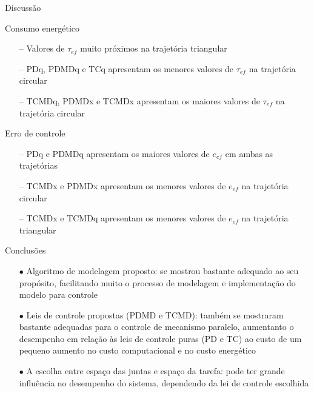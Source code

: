 \documentclass[25pt,landscape]{beamer}
\begin{document}
\begin{frame}{Discussão}
    \begin{block}{Consumo energético}
        \begin{itemize}
            \item[--] Valores de $\tau_{ef}$ muito próximos na trajetória triangular \\[4pt]
            \item[--] PDq, PDMDq e TCq apresentam os menores valores de $\tau_{ef}$ na trajetória circular \\[4pt]
            \item[--] TCMDq, PDMDx e TCMDx apresentam os maiores valores de $\tau_{ef}$ na trajetória circular \\[4pt]
        \end{itemize}
    \end{block}
    \begin{block}{Erro de controle}
        \begin{itemize}
            \item[--] PDq e PDMDq apresentam os maiores valores de $e_{ef}$ em ambas as trajetórias \\[4pt]
            \item[--] TCMDx e PDMDx apresentam os menores valores de $e_{ef}$ na trajetória circular \\[4pt]
            \item[--] TCMDx e TCMDq apresentam os menores valores de $e_{ef}$ na trajetória triangular \\[4pt]
        \end{itemize}
    \end{block}
\end{frame}

\begin{frame}{Conclusões}
    \begin{block}{}
        \begin{itemize}
            \item[$\bullet$] Algoritmo de modelagem proposto: se mostrou bastante adequado ao seu propósito, facilitando muito o processo de modelagem e implementação do modelo para controle \\[8pt]
            \item[$\bullet$] Leis de controle propostas (PDMD e TCMD): também se mostraram bastante adequadas para o controle de mecanismo paralelo, aumentanto o desempenho em relação às leis de controle puras (PD e TC) ao custo de um pequeno aumento no custo computacional e no custo energético \\[8pt]
            \item[$\bullet$] A escolha entre espaço das juntas e espaço da tarefa: pode ter grande influência no desempenho do sistema, dependendo da lei de controle escolhida \\[8pt]
        \end{itemize}
    \end{block}
\end{frame}
\end{document}
